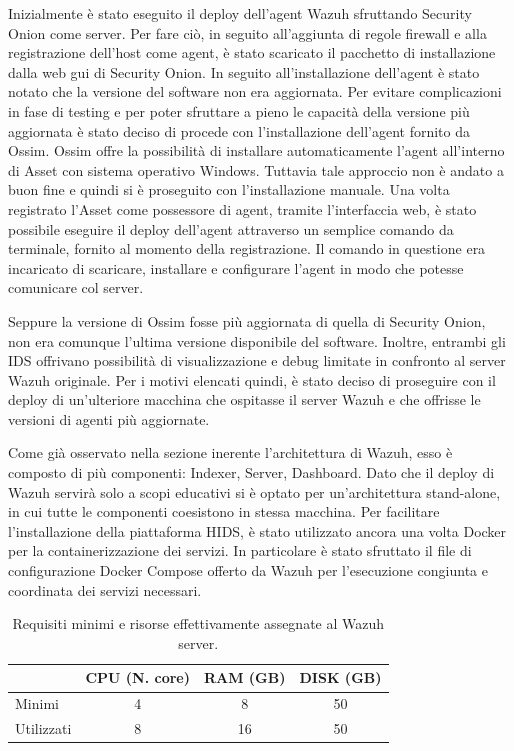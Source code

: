 Inizialmente è stato eseguito il deploy dell'agent Wazuh sfruttando  Security Onion come server. Per fare ciò, in seguito all'aggiunta di regole firewall e alla registrazione dell'host  come agent, è stato scaricato il pacchetto di installazione dalla web gui di Security Onion. In seguito all'installazione dell'agent è stato notato che la versione del software non era aggiornata. Per evitare complicazioni in fase di testing e per poter sfruttare a pieno le capacità della versione più aggiornata è stato deciso di procede con l'installazione dell'agent fornito da Ossim. 
\medskip
Ossim offre la possibilità di installare automaticamente l'agent all'interno di Asset con sistema operativo Windows. Tuttavia tale approccio non è andato a buon fine e quindi si è proseguito con l'installazione manuale. Una volta registrato l'Asset come possessore di agent, tramite l'interfaccia web, è stato possibile eseguire il deploy dell'agent  attraverso un semplice comando da terminale, fornito al momento della registrazione. Il comando in questione era incaricato  di scaricare, installare e configurare l'agent  in modo che potesse comunicare col server.

Seppure la versione di Ossim fosse più aggiornata di quella di Security Onion, non era comunque l'ultima versione disponibile del software. Inoltre, entrambi gli IDS offrivano possibilità di visualizzazione e debug limitate in confronto al server Wazuh originale.
Per i motivi elencati quindi, è stato deciso di proseguire con il deploy di un'ulteriore macchina che ospitasse il server Wazuh e che offrisse le versioni di agenti più aggiornate.

\medskip

Come già osservato nella sezione inerente l'architettura di Wazuh, esso è composto di più componenti: Indexer, Server, Dashboard.  Dato che il deploy di Wazuh servirà solo a scopi educativi si è optato per un'architettura stand-alone, in cui tutte le componenti coesistono in stessa macchina. Per facilitare l'installazione della piattaforma HIDS, è stato utilizzato ancora una volta Docker per la containerizzazione dei servizi. In particolare è stato sfruttato il file di configurazione Docker Compose offerto da Wazuh per l'esecuzione congiunta e coordinata dei servizi necessari.

\begin{table}[hbtp]
    \centering
    \begin{tabular}{|l|c|c|c|}
        \hline
        & CPU (N. core) & RAM (GB) & DISK (GB) \\
        \hline
        Minimi     & 4 & 8 & 50   \\
        \hline
        Utilizzati & 8   & 16  & 50 \\
        \hline
    \end{tabular}
    \caption{Requisiti minimi e risorse effettivamente assegnate al Wazuh server.}
    \label{tab:requisitiHwWazuh}
\end{table}




